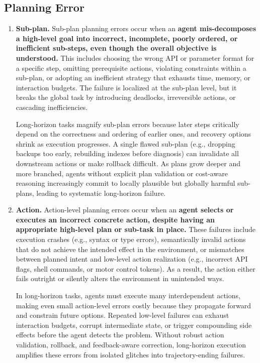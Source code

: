 \documentclass[11pt]{article}
\begin{document}
\subsection{Planning Error}
\begin{enumerate}
\item \textbf{Sub-plan.}
Sub-plan planning errors occur when an \textbf{agent mis-decomposes a high-level goal into incorrect, incomplete, poorly ordered, or inefficient sub-steps, even though the overall objective is understood.} This includes choosing the wrong API or parameter format for a specific step, omitting prerequisite actions, violating constraints within a sub-plan, or adopting an inefficient strategy that exhausts time, memory, or interaction budgets. The failure is localized at the sub-plan level, but it breaks the global task by introducing deadlocks, irreversible actions, or cascading inefficiencies.

Long-horizon tasks magnify sub-plan errors because later steps critically depend on the correctness and ordering of earlier ones, and recovery options shrink as execution progresses. A single flawed sub-plan (e.g., dropping backups too early, rebuilding indexes before diagnosis) can invalidate all downstream actions or make rollback difficult. As plans grow deeper and more branched, agents without explicit plan validation or cost-aware reasoning increasingly commit to locally plausible but globally harmful sub-plans, leading to systematic long-horizon failure.
\item \textbf{Action.}
Action-level planning errors occur when an \textbf{agent selects or executes an incorrect concrete action, despite having an appropriate high-level plan or sub-task in place.} These failures include execution crashes (e.g., syntax or type errors), semantically invalid actions that do not achieve the intended effect in the environment, or mismatches between planned intent and low-level action realization (e.g., incorrect API flags, shell commands, or motor control tokens). As a result, the action either fails outright or silently alters the environment in unintended ways.

In long-horizon tasks, agents must execute many interdependent actions, making even small action-level errors costly because they propagate forward and constrain future options. Repeated low-level failures can exhaust interaction budgets, corrupt intermediate state, or trigger compounding side effects before the agent detects the problem. Without robust action validation, rollback, and feedback-aware correction, long-horizon execution amplifies these errors from isolated glitches into trajectory-ending failures.
\end{enumerate}
\end{document}
